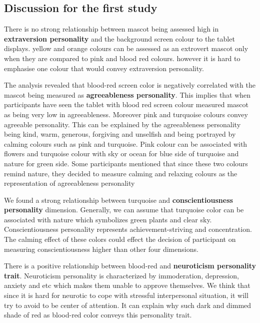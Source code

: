 \subsection{Discussion for the first study}
\label{subsec:discussion-for-the-first-study3}

\par There is no strong relationship between mascot being assessed high
in \textbf{extraversion personality} and the background screen colour to the tablet displays.
yellow and orange colours can be assessed as an extrovert mascot only when they are compared to
pink and blood red colours.
however it is hard to emphasise one colour that would convey extraversion personality.

\par The analysis revealed that blood-red screen color is negatively correlated with the mascot
being measured as \textbf{agreeableness personality}.
This implies that when participants have seen the tablet with blood red screen colour measured
mascot as being very low in agreeableness.
Moreover pink and turquoise colours convey agreeable personality.
This can be explained by the agreeableness personality being kind, warm, generous,
forgiving and unselfish and being portrayed by calming colours such as pink and turquoise.
Pink colour can be associated with flowers and turquoise colour with sky or ocean for blue side
of turquoise and nature for green side.
Some participants mentioned that since these two colours remind nature, they decided to measure
calming and relaxing colours as the representation of agreeableness personality

\par We found a strong relationship between turquoise and \textbf{conscientiousness personality} dimension.
Generally, we can assume that turquoise color can be associated with nature which symbolizes green plants and clear sky.
Conscientiousness personality represents achievement-striving and concentration.
The calming effect of these colors could effect the decision of participant on measuring
conscientiousness higher than other four dimensions.

\par There is a positive relationship between blood-red and \textbf{neuroticism personality trait}.
Neuroticism personality is characterized by immoderation, depression, anxiety and etc which
makes them unable to approve themselves.
We think that since it is hard for neurotic to cope with stressful interpersonal situation,
it will try to avoid to be center of attention.
It can explain why such dark and dimmed shade of red as blood-red color conveys this personality trait.

